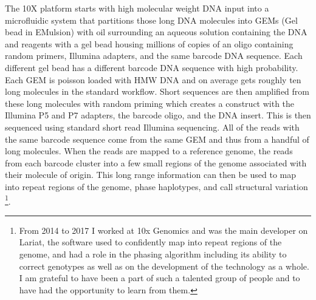 \par{
The 10X platform starts with high molecular weight DNA input into a microfluidic system that partitions those long DNA molecules into GEMs (Gel bead in EMulsion) with oil surrounding an aqueous solution containing the DNA and reagents with a gel bead housing millions of copies of an oligo containing random primers, Illumina adapters, and the same barcode DNA sequence. Each different gel bead has a different barcode DNA sequence with high probability. Each GEM is poisson loaded with HMW DNA and on average gets roughly ten long molecules in the standard workflow. Short sequences are then amplified from these long molecules with random priming which creates a construct with the Illumina P5 and P7 adapters, the barcode oligo, and the DNA insert. This is then sequenced using standard short read Illumina sequencing. All of the reads with the same barcode sequence come from the same GEM and thus from a handful of long molecules. When the reads are mapped to a reference genome, the reads from each barcode cluster into a few small regions of the genome associated with their molecule of origin. This long range information can then be used to map into repeat regions of the genome, phase haplotypes, and call structural variation \cite{10xlinked}\footnote{From 2014 to 2017 I worked at 10x Genomics and was the main developer on Lariat, the software used to confidently map into repeat regions of the genome, and had a role in the phasing algorithm including its ability to correct genotypes as well as on the development of the technology as a whole. I am grateful to have been a part of such a talented group of people and to have had the opportunity to learn from them.}.
}

